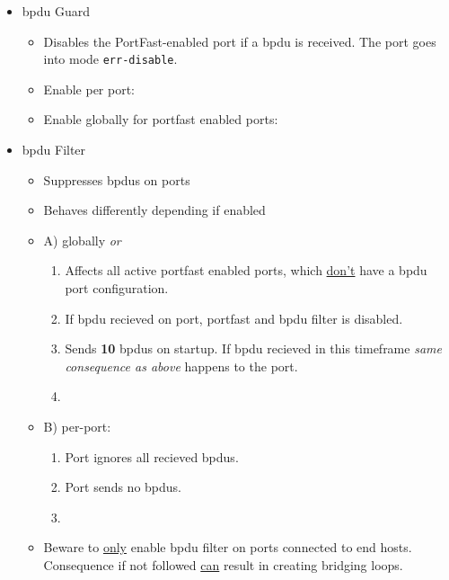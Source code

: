 \begin{itemize}
    \item \gls{bpdu} Guard
    \begin{itemize}
        \item Disables the PortFast-enabled port if a \gls{bpdu} is received. The port goes into mode \texttt{err-disable}.
        \item Enable per port:\\
        \item Enable globally for portfast enabled ports:\\
    \end{itemize}
    \item \gls{bpdu} Filter
    \begin{itemize}
        \item Suppresses \gls{bpdu}s on ports
        \item Behaves differently depending if enabled
        \item A) globally \textit{or}
        \begin{enumerate}
            \item Affects all active portfast enabled ports, which \underline{don't} have a \gls{bpdu} port configuration.
            \item If \gls{bpdu} recieved on port, portfast and \gls{bpdu} filter is disabled.
            \item Sends \textbf{10} \gls{bpdu}s on startup. If \gls{bpdu} recieved in this timeframe \textit{same consequence as above} happens to the port.
            \item {}
        \end{enumerate}
        \item B) per-port:
        \begin{enumerate}
            \item Port ignores all recieved \gls{bpdu}s.
            \item Port sends no \gls{bpdu}s.
            \item {}
        \end{enumerate}
        \item Beware to \underline{only} enable \gls{bpdu} filter on ports connected to end hosts. Consequence if not followed \underline{can} result in creating bridging loops.

\end{itemize}
\end{itemize}
